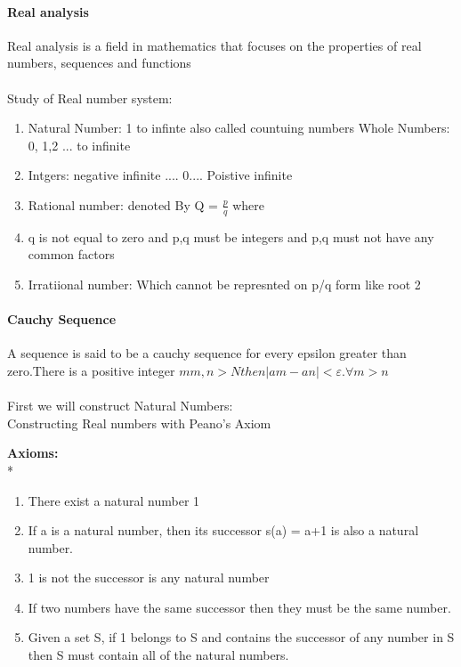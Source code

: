 \documentclass[15]{article}
\begin{document}
\paragraph{Real analysis} Real analysis is a field in mathematics that focuses on the properties of real numbers, sequences and functions
\\
\\
Study of Real number system:
\begin{enumerate}

\item Natural Number: 1 to infinte also called countuing numbers
 Whole Numbers: 0, 1,2 ... to infinite
\item Intgers:  negative infinite .... 0.... Poistive infinite 
\item Rational number:  denoted By Q = $\frac{p}{q}$ where \item q is not equal to zero and p,q must be integers and p,q must not have any common factors
\item Irratiional number: Which cannot be represnted on p/q form like root 2

\end{enumerate}

\paragraph{Cauchy Sequence }
A sequence is said to be a cauchy sequence  for every epsilon greater than zero.There is a positive integer $m          m, n > N then |am- an| < ε. \forall  m>n$ \\
\\
First we will construct Natural Numbers:
\\
Constructing Real numbers with Peano’s Axiom
\
\vspace{5mm} %

\textbf{Axioms:}
\\*
\begin{enumerate}
\item There exist a natural number 1
\item If a is a natural number, then its successor  s(a) = a+1 is also a natural number.
\item 1 is not the successor is any natural number
\item If two numbers have the same successor then they must be the same number.
\item Given a set S, if 1 belongs to S and contains the successor of any number in S then S must contain all of the natural numbers.\\
\end{enumerate}
\end{document}

